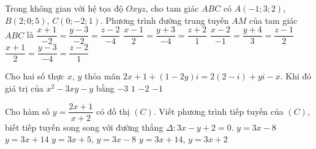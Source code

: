 \begin{ex}%
Trong không gian với hệ tọa độ $Oxyz$, cho tam giác $ABC$ có $A(-1;3;2)$, $B(2;0;5)$, $C(0;-2;1)$. Phương trình đường trung tuyến $AM$ của tam giác $ABC$ là
\choice
{$\dfrac{x+1}{-2}=\dfrac{y-3}{-2}=\dfrac{z-2}{-4}$}
{$\dfrac{x-1}{2}=\dfrac{y+3}{-4}=\dfrac{z+2}{1}$}
{$\dfrac{x-2}{-1}=\dfrac{y+4}{3}=\dfrac{z-1}{2}$}
{\True $\dfrac{x+1}{2}=\dfrac{y-3}{-4}=\dfrac{z-2}{1}$} 
\end{ex}

\begin{ex}%
Cho hai số thực $x$, $y$ thỏa mãn $2x+1+(1-2y)i=2(2-i)+yi-x$. Khi đó giá trị của $x^2-3xy-y$ bằng
\choice
{\True $-3$}
{$1$}
{$-2$}
{$-1$} 
\end{ex}

\begin{ex}%
Cho hàm số $y=\dfrac{2x+1}{x+2}$ có đồ thị $(C)$. Viết phương trình tiếp tuyến của $(C)$, biết tiếp tuyến song song với đường thẳng $\Delta : 3x-y+2=0$.
\choice
{$y=3x-8$}
{$y=3x+14 $}
{$y=3x+5$, $y=3x-8$}
{\True $y=3x+14$, $y=3x+2$} 
\end{ex}

